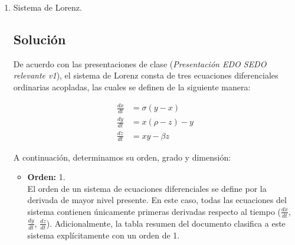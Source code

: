 \begin{enumerate}[label=\arabic*., leftmargin=*]
\begin{itemize}[leftmargin=*]
        \item \textbf{Desventajas de este algoritmo:}\\
        Es extremadamente \textbf{costoso computacionalmente y lento}, requiriendo iteraciones numéricas prolongadas (minutos u horas) para resolver las ecuaciones diferenciales por cada par de imágenes analizado.

        \item \textbf{Enfoque y ventajas de VoxelMorph y R2Net:}\\
        Utilizan un enfoque basado en \textbf{Aprendizaje Profundo (Deep Learning / Redes Neuronales Convolucionales)}.
        \begin{itemize}[leftmargin=*]
            \item \textbf{Enfoque:} Entrenan redes neuronales para aprender a predecir directamente el campo de deformación difeomórfica en una sola pasada hacia adelante.
            \item \textbf{Ventajas:} Reducen el tiempo de cómputo de minutos a \textbf{milisegundos (tiempo real)} de forma escalable, manteniendo las propiedades de preservación de topología e invertibilidad.
        \end{itemize}
    \end{itemize}
    
    \item Sistema de Lorenz.
    
    \subsection{Solución}

    De acuerdo con las presentaciones de clase (\textit{Presentación EDO SEDO relevante v1}), el sistema de Lorenz consta de tres ecuaciones diferenciales ordinarias acopladas, las cuales se definen de la siguiente manera:

    \begin{align*}
        \frac{dx}{dt} &= \sigma(y - x) \\
        \frac{dy}{dt} &= x(\rho - z) - y \\
        \frac{dz}{dt} &= xy - \beta z
    \end{align*}

    A continuación, determinamos su orden, grado y dimensión:

    \begin{itemize}[leftmargin=*]
        \item \textbf{Orden:} 1.\\
        El orden de un sistema de ecuaciones diferenciales se define por la derivada de mayor nivel presente. En este caso, todas las ecuaciones del sistema contienen únicamente primeras derivadas respecto al tiempo ($\frac{dx}{dt}$, $\frac{dy}{dt}$, $\frac{dz}{dt}$). Adicionalmente, la tabla resumen del documento clasifica a este sistema explícitamente con un orden de 1.


\end{itemize}
\end{enumerate}
